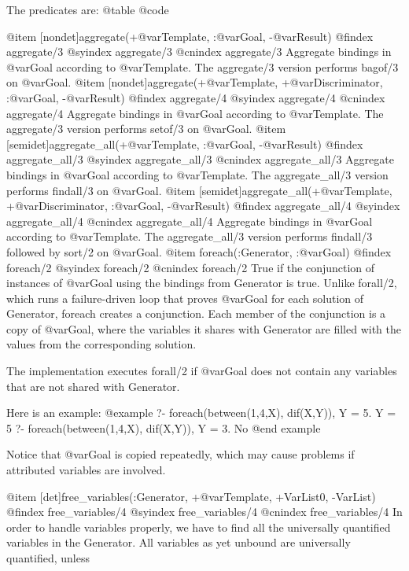 {{{{{{{{{The predicates are:
@table @code

@item [nondet]aggregate(+@var{Template}, :@var{Goal}, -@var{Result})
@findex aggregate/3
@syindex aggregate/3
@cnindex aggregate/3
    Aggregate bindings in @var{Goal} according to @var{Template}. The
    aggregate/3 version performs bagof/3 on @var{Goal}.
@item [nondet]aggregate(+@var{Template}, +@var{Discriminator}, :@var{Goal}, -@var{Result})
@findex aggregate/4
@syindex aggregate/4
@cnindex aggregate/4
    Aggregate bindings in @var{Goal} according to @var{Template}. The
    aggregate/3 version performs setof/3 on @var{Goal}.
@item [semidet]aggregate_all(+@var{Template}, :@var{Goal}, -@var{Result})
@findex aggregate_all/3
@syindex aggregate_all/3
@cnindex aggregate_all/3
    Aggregate bindings in @var{Goal} according to @var{Template}. The
    aggregate_all/3 version performs findall/3 on @var{Goal}.
@item [semidet]aggregate_all(+@var{Template}, +@var{Discriminator}, :@var{Goal}, -@var{Result})
@findex aggregate_all/4
@syindex aggregate_all/4
@cnindex aggregate_all/4
    Aggregate bindings in @var{Goal} according to @var{Template}. The
    aggregate_all/3 version performs findall/3 followed by sort/2 on
    @var{Goal}.
@item foreach(:Generator, :@var{Goal})
@findex foreach/2
@syindex foreach/2
@cnindex foreach/2
    True if the conjunction of instances of @var{Goal} using the
    bindings from Generator is true. Unlike forall/2, which runs a
    failure-driven loop that proves @var{Goal} for each solution of
    Generator, foreach creates a conjunction. Each member of the
    conjunction is a copy of @var{Goal}, where the variables it shares
    with Generator are filled with the values from the corresponding
    solution.

    The implementation executes forall/2 if @var{Goal} does not contain
    any variables that are not shared with Generator.

    Here is an example:
@example
    ?- foreach(between(1,4,X), dif(X,Y)), Y = 5.
    Y = 5
    ?- foreach(between(1,4,X), dif(X,Y)), Y = 3.
    No
@end example

    Notice that @var{Goal} is copied repeatedly, which may cause
    problems if attributed variables are involved.

@item [det]free_variables(:Generator, +@var{Template}, +VarList0, -VarList)
@findex free_variables/4
@syindex free_variables/4
@cnindex free_variables/4
    In order to handle variables properly, we have to find all the universally quantified variables in the Generator. All variables as yet unbound are universally quantified, unless

}}}}}}}}}
